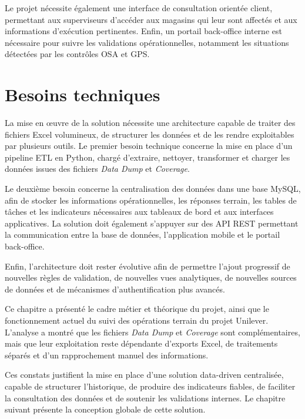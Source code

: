 Le projet nécessite également une interface de consultation orientée client, permettant aux superviseurs d’accéder aux magasins qui leur sont affectés et aux informations d’exécution pertinentes. Enfin, un portail back-office interne est nécessaire pour suivre les validations opérationnelles, notamment les situations détectées par les contrôles OSA et GPS.

\section{Besoins techniques}

La mise en œuvre de la solution nécessite une architecture capable de traiter des fichiers Excel volumineux, de structurer les données et de les rendre exploitables par plusieurs outils. Le premier besoin technique concerne la mise en place d’un pipeline ETL en Python, chargé d’extraire, nettoyer, transformer et charger les données issues des fichiers \textit{Data Dump} et \textit{Coverage}.

Le deuxième besoin concerne la centralisation des données dans une base MySQL, afin de stocker les informations opérationnelles, les réponses terrain, les tables de tâches et les indicateurs nécessaires aux tableaux de bord et aux interfaces applicatives. La solution doit également s’appuyer sur des API REST permettant la communication entre la base de données, l’application mobile et le portail back-office.

Enfin, l’architecture doit rester évolutive afin de permettre l’ajout progressif de nouvelles règles de validation, de nouvelles vues analytiques, de nouvelles sources de données et de mécanismes d’authentification plus avancés.

Ce chapitre a présenté le cadre métier et théorique du projet, ainsi que le fonctionnement actuel du suivi des opérations terrain du projet Unilever. L’analyse a montré que les fichiers \textit{Data Dump} et \textit{Coverage} sont complémentaires, mais que leur exploitation reste dépendante d’exports Excel, de traitements séparés et d’un rapprochement manuel des informations.

Ces constats justifient la mise en place d’une solution data-driven centralisée, capable de structurer l’historique, de produire des indicateurs fiables, de faciliter la consultation des données et de soutenir les validations internes. Le chapitre suivant présente la conception globale de cette solution.
